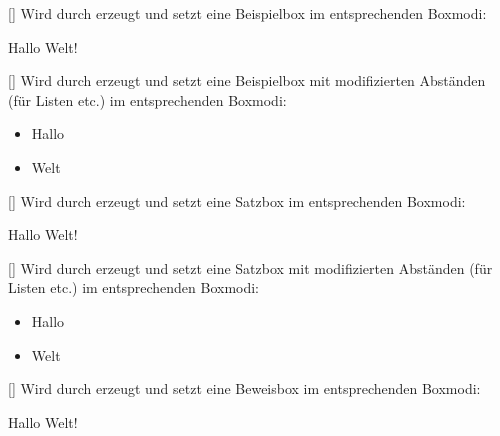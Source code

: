 %
%
%

[]
Wird durch  erzeugt und setzt eine Beispielbox im entsprechenden Boxmodi:
\begin{latex}
\begin{beispiel}[Hallo]
   Hallo Welt!
\end{beispiel}
\end{latex} 

%
%
%

[]
Wird durch  erzeugt und setzt eine Beispielbox mit modifizierten Abständen (für Listen etc.) im entsprechenden Boxmodi:
\begin{latex}
\begin{beispiel*}[Hallo]
   \begin{itemize}
       \item Hallo
       \item Welt
   \end{itemize}
\end{beispiel*}
\end{latex}

%
%
%

[]
Wird durch  erzeugt und setzt eine Satzbox im entsprechenden Boxmodi:
\begin{latex}
\begin{satz}[Hallo]
   Hallo Welt!
\end{satz}
\end{latex} 

%
%
%

[]
Wird durch  erzeugt und setzt eine Satzbox mit modifizierten Abständen (für Listen etc.) im entsprechenden Boxmodi:
\begin{latex}
\begin{satz*}[Hallo]
   \begin{itemize}
       \item Hallo
       \item Welt
   \end{itemize}
\end{satz*}
\end{latex}

%
%
%

[]
Wird durch  erzeugt und setzt eine Beweisbox im entsprechenden Boxmodi:
\begin{latex}
\begin{beweis}[Hallo]
   Hallo Welt!
\end{beweis}
\end{latex} 

